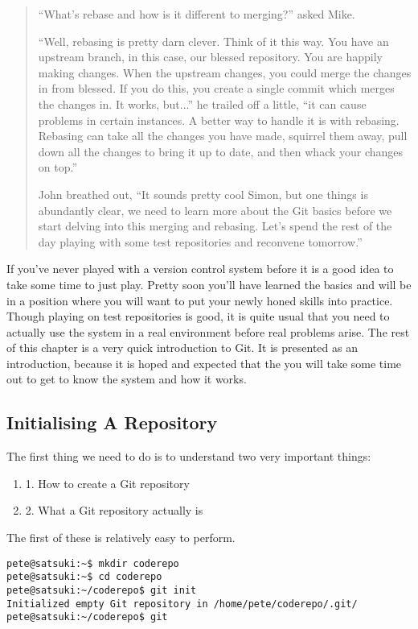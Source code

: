 \begin{quote}
``What's rebase and how is it different to merging?'' asked Mike. 

``Well, rebasing is pretty darn clever.  Think of it this way.  You have an upstream branch, in this case, our blessed repository.  You are happily making changes.  When the upstream changes, you could merge the changes in from blessed.  If you do this, you create a single commit which merges the changes in.  It works, but...'' he trailed off a little, ``it can cause problems in certain instances.  A better way to handle it is with rebasing.  Rebasing can take all the changes you have made, squirrel them away, pull down all the changes to bring it up to date, and then whack your changes on top.''

John breathed out, ``It sounds pretty cool Simon, but one things is abundantly clear, we need to learn more about the Git basics before we start delving into this merging and rebasing.  Let's spend the rest of the day playing with some test repositories and reconvene tomorrow.''
\end{quote}

If you've never played with a version control system before it is a good idea to take some time to just play.  Pretty soon you'll have learned the basics and will be in a position where you will want to put your newly honed skills into practice.  Though playing on test repositories is good, it is quite usual that you need to actually use the system in a real environment before real problems arise.  The rest of this chapter is a very quick introduction to Git.  It is presented as an introduction, because it is hoped and expected that the you will take some time out to get to know the system and how it works. 

\subsection*{Initialising A Repository}
The first thing we need to do is to understand two very important things: 

\begin{enumerate}
  \item 1. How to create a Git repository 
  \item 2. What a Git repository actually is 
\end{enumerate}

The first of these is relatively easy to perform.  

\begin{verbatim} 
pete@satsuki:~$ mkdir coderepo 
pete@satsuki:~$ cd coderepo 
pete@satsuki:~/coderepo$ git init 
Initialized empty Git repository in /home/pete/coderepo/.git/ 
pete@satsuki:~/coderepo$ git 
\end{verbatim} 

